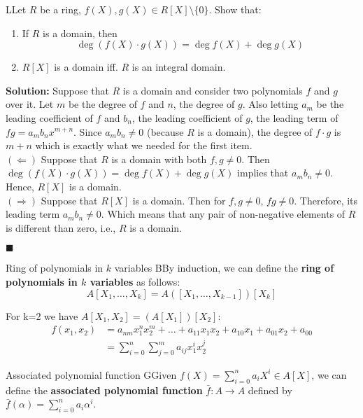 \documentclass[12pt,a4paper]{article}
\begin{document}
\begin{example}{}
LLet $R$ be a ring, $f(X), g(X) \in R[X] \setminus \{ 0 \}$. Show that:
\begin{enumerate}
\item If $R$ is a domain, then 
\[
\deg(f(X) \cdot g(X)) = \deg f(X) + \deg g(X)
\]
\item $R[X]$ is a domain iff. $R$ is an integral domain.
\end{enumerate}

\textbf{Solution:} Suppose that $R$ is a domain and consider two polynomials $f$ and $g$ over it. Let $m$ be the degree of $f$ and $n$, the degree of $g$. Also letting $a_m$ be the leading coefficient of $f$ and $b_n$, the leading coefficient of $g$, the leading term of $fg = a_m b_n x^{m+n}$. Since $a_m b_n \neq 0$ (because $R$ is a domain), the degree of $f \cdot g$ is $m+n$ which is exactly what we needed for the first item. \\

$(\Leftarrow)$ Suppose that $R$ is a domain with both $f, g \neq 0$. Then $\deg(f(X) \cdot g(X)) = \deg f(X) + \deg g(X)$ implies that $a_m b_n \neq 0$. Hence, $R[X]$ is a domain. \\

$(\Rightarrow)$ Suppose that $R[X]$ is a domain. Then for $f, g \neq 0$, $fg \neq 0$. Therefore, its leading term $a_m b_n \neq 0$. Which means that any pair of non-negative elements of $R$ is different than zero, i.e., $R$ is a domain.

\hfill $\blacksquare$
\end{example}

\begin{defn}{Ring of polynomials in $k$ variables}
BBy induction, we can define the \textbf{ring of polynomials in $k$ variables} as follows:
\[
A[X_1,\ldots,X_k] = A([X_1,\ldots,X_{k-1}])[X_k]
\]
\end{defn}

For k=2 we have $A[X_1,X_2] = (A[X_1])[X_2]$:
\begin{equation*}
\begin{aligned}
f(x_1,x_2) & = a_{nm}x_1^{n} x_2^{m} + \ldots + a_{11}x_1 x_2 + a_{10}x_1 + a_{01}x_2 + a_{00} \\
& = \sum_{i=0}^n \sum_{j=0}^m a_{ij} x_1^i x_2^j
\end{aligned}
\end{equation*}

\begin{defn}{Associated polynomial function}
GGiven $f(X) = \sum_{i=0}^n  a_i X^i \in A[X]$, we can define the \textbf{associated polynomial function} $\bar{f} : A \to A$ defined by $\bar{f}(\alpha) = \sum_{i=0}^n a_i \alpha^i$.
\end{defn}
\end{document}
